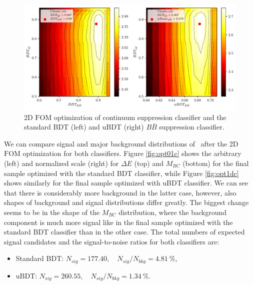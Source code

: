 \begin{figure}[H]
\centering
\captionsetup{width=0.8\linewidth}
\includegraphics[width=\linewidth]{fig/mva_fom}
\caption{2D $\mathrm{FOM}$ optimization of continuum suppression classifier and the standard BDT (left) and uBDT (right) $B\bar B$ suppression classifier.}
\label{fig:mvafom}
\end{figure}

We can compare signal and major background distributions of \vars~after the 2D $\mathrm{FOM}$ optimization for both classifiers. Figure \ref{fig:opt01c} shows the arbitrary (left) and normalized scale (right) for $\Delta E$ (top) and $M_{BC}$ (bottom) for the final sample optimized with the standard BDT classifier, while Figure \ref{fig:opt1dc} shows similarly for the final sample optimized with uBDT classifier. We can see that there is considerably more background in the latter case, however, also shapes of background and signal distributions differ greatly. The biggest change seems to be in the shape of the $M_{BC}$ distribution, where the background component is much more signal like in the final sample optimized with the standard BDT classifier than in the other case. The total numbers of expected signal candidates and the signal-to-noise ratios for both classifiers are:
\begin{itemize}
\item Standard BDT: $N_{sig} = 177.40,\quad N_{sig}/N_{bkg} = 4.81~\%$,
\item uBDT: $N_{sig} = 260.55,\quad N_{sig}/N_{bkg} = 1.34~\%$.
\end{itemize}

